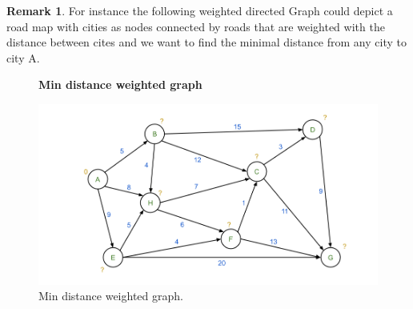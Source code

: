 \documentclass{article}
\theoremstyle{definition}
\newtheorem{remark}[theorem]{Remark}
\newcommand*{\figuretitle}[1]{%
    {\centering%
    \textbf{#1}%
    \par\medskip}%
}
\begin{document}
\begin{remark}
For instance the following weighted directed Graph could depict a road map with cities as nodes connected by roads that are weighted with the distance between cites and we want to find the minimal distance from any city to city A. \

\begin{figure}[H]
\centering
\figuretitle{Min distance weighted graph}
\includegraphics[scale=0.5]{graphics/weighted_directed_graph_2.png}
\caption{Min distance weighted graph.}
\label{fig:neuron}
\end{figure}


\end{remark}
\end{document}
